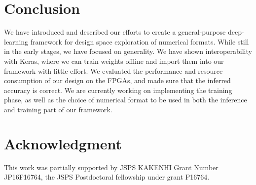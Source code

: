 \documentclass[techrep,english]{ipsj} %
\begin{document}
\section{Conclusion}\label{sec:conclusion}
We have introduced and described our efforts to create a general-purpose deep-learning framework for design space exploration of numerical formats.
While still in the early stages, we have focused on generality.
We have shown interoperability with Keras, where we can train weights offline and import them into our framework with little effort.
We evaluated the performance and resource consumption of our design on the FPGAs, and made sure that the inferred accuracy is correct.
We are currently working on implementing the training phase, as well as the choice of numerical format to be used in both the inference and training part of our framework.


\section{Acknowledgment}\label{sec:acknowledgment}
This work was partially supported by JSPS KAKENHI Grant Number JP16F16764, the JSPS Postdoctoral fellowship under grant P16764.
\end{document}
